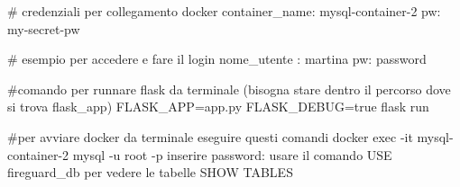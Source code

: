 # credenziali per collegamento docker
container_name: mysql-container-2
pw: my-secret-pw

# esempio per accedere e fare il login 
nome_utente : martina
pw: password

#comando per runnare flask da terminale (bisogna stare dentro il percorso dove si trova flask_app)
FLASK_APP=app.py FLASK_DEBUG=true flask run 

#per avviare docker da terminale eseguire questi comandi
docker exec -it mysql-container-2 mysql -u root -p
inserire password: 
usare il comando USE fireguard_db
per vedere le tabelle SHOW TABLES
